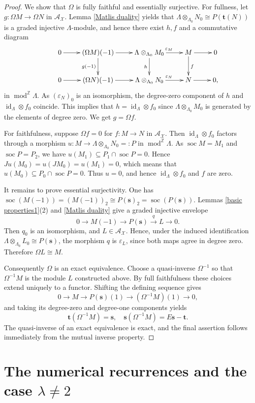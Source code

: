 \documentclass{amsart}
\theoremstyle{definition}
\theoremstyle{remark}
\numberwithin{equation}{thm}
\def\A{\mathcal{A}}
\def\gmod{\operatorname{mod}^{\mathbb{Z}}\!}
\def\id{\operatorname{id}}
\def\L{\Lambda}
\def\soc{\operatorname{soc}}
\def\X{\mathcal{X}}
\def\bfs{\mathbf{s}}
\def\bft{\mathbf{t}}
\begin{document}
\begin{proof}
We show that $\Omega$ is fully faithful and essentially surjective.
For fullness, let $g:\Omega M\to\Omega N$ in $\A_\X$. 
Lemma \ref{Matlis duality} yields that $\L\otimes_{\L_0} N_0\cong P(\bft(N))$ is a graded injective $\L$-module, and hence there exist $h, f$ and a commutative diagram
$$
\xymatrix{
&0\ar[r]&(\Omega M)(-1)\ar[r]\ar[d]_{g(-1)}&\L\otimes_{\L_0}M_0\ar[r]^{\varepsilon_M}\ar[d]_{h}
&M\ar[d]^f\ar[r] &0\\
&0\ar[r]&(\Omega N)(-1)\ar[r]&\L\otimes_{\L_0}N_0\ar[r]^{\varepsilon_N}
&N\ar[r] &0,
}
$$
in $\gmod\L$. As $(\varepsilon_N)_0$ is an isomorphism, the degree-zero component of $h$ and $\id_{\L}\otimes f_0$ coincide.
This implies that $h=\id_{\L}\otimes f_0$ since $\L\otimes_{\L_0}M_0$ is generated by the elements of degree zero. We get $g=\Omega f$.

For faithfulness, suppose $\Omega f=0$ for $f:M\to N$ in $\A_\X$.  
Then $\id_\L\otimes f_0$ factors through a morphism $u:M\to\L\otimes_{\L_0}N_0=:P$ in $\gmod\L$.
As $\soc M=M_1$ and $\soc P=P_2$, we have $u(M_1)\subseteq P_1\cap \soc P=0$.
Hence $Ju(M_0)=u(JM_0)=u(M_1)=0$, which means that $u(M_0)\subseteq P_0\cap \soc P=0$. Thus $u=0$, and hence $\id_\L\otimes f_0$ and $f$ are zero.

It remains to prove essential surjectivity.
One has $\soc(M(-1))=(M(-1))_2\cong P(\bfs)_2=\soc(P(\bfs))$.
Lemmas \ref{basic properties1}(2) and \ref{Matlis duality} give a
graded injective envelope 
$$
0\to M(-1)\to P(\bfs)\xrightarrow{q} L\to0.
$$
Then $q_0$ is an isomorphism, and $L\in\A_\X$. Hence, under the induced identification $\L\otimes_{\L_0}L_0\cong P(\bfs)$, the morphism $q$ is $\varepsilon_L$, since both maps agree in degree
zero. Therefore $\Omega L\cong M$.

Consequently $\Omega$ is an exact equivalence. Choose a quasi-inverse $\Omega^{-1}$ so that $\Omega^{-1}M$ is the module $L$ constructed above.
By full faithfulness these choices extend uniquely to a functor.
Shifting the defining sequence gives
$$
0\to M\to P(\bfs)(1)\to (\Omega^{-1}M)(1)\to0,
$$
and taking its degree-zero and degree-one components yields
$$
\bft(\Omega^{-1}M)=\bfs,
\quad
\bfs(\Omega^{-1}M)=E\bfs-\bft.
$$
The quasi-inverse of an exact equivalence is exact, and the final assertion follows immediately from the mutual inverse property.
\end{proof}

\section{The numerical recurrences and the case $\lambda\ne 2$}
\end{document}
